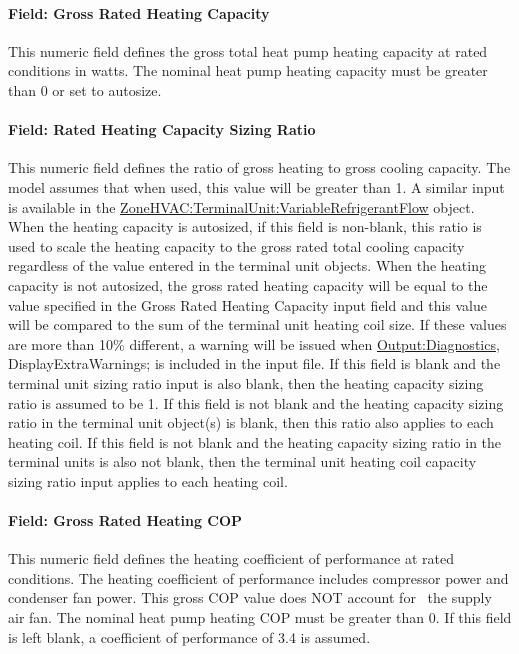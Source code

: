 \paragraph{Field: Gross Rated Heating Capacity}\label{field-gross-rated-heating-capacity-001}

This numeric field defines the gross total heat pump heating capacity at rated conditions in watts. The nominal heat pump heating capacity must be greater than 0 or set to autosize.

\paragraph{Field: Rated Heating Capacity Sizing Ratio}\label{field-rated-heating-capacity-sizing-ratio-000}

This numeric field defines the ratio of gross heating to gross cooling capacity. The model assumes that when used, this value will be greater than 1. A similar input is available in the \hyperref[zonehvacterminalunitvariablerefrigerantflow]{ZoneHVAC:TerminalUnit:VariableRefrigerantFlow} object. When the heating capacity is autosized, if this field is non-blank, this ratio is used to scale the heating capacity to the gross rated total cooling capacity regardless of the value entered in the terminal unit objects. When the heating capacity is not autosized, the gross rated heating capacity will be equal to the value specified in the Gross Rated Heating Capacity input field and this value will be compared to the sum of the terminal unit heating coil size. If these values are more than 10\% different, a warning will be issued when \hyperref[outputdiagnostics]{Output:Diagnostics}, DisplayExtraWarnings; is included in the input file. If this field is blank and the terminal unit sizing ratio input is also blank, then the heating capacity sizing ratio is assumed to be 1. If this field is not blank and the heating capacity sizing ratio in the terminal unit object(s) is blank, then this ratio also applies to each heating coil. If this field is not blank and the heating capacity sizing ratio in the terminal units is also not blank, then the terminal unit heating coil capacity sizing ratio input applies to each heating coil.

\paragraph{Field: Gross Rated Heating COP}\label{field-gross-rated-heating-cop-001}

This numeric field defines the heating coefficient of performance at rated conditions. The heating coefficient of performance includes compressor power and condenser fan power. This gross COP value does NOT account for~ the supply air fan. The nominal heat pump heating COP must be greater than 0. If this field is left blank, a coefficient of performance of 3.4 is assumed.

